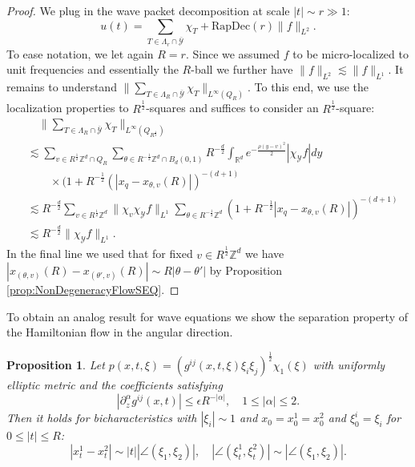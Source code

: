 \documentclass{amsart}
\newtheorem{proposition}[theorem]{Proposition}
\theoremstyle{definition}
\newcommand{\R}{\mathbb{R}}
\newcommand{\Z}{\mathbb{Z}}
\begin{document}
\begin{proof}
We plug in the wave packet decomposition at scale $|t| \sim r \gg 1$:
\begin{equation*}
u(t) = \sum_{T \in \Lambda_r \cap \overline{\mathcal{Y}}} \chi_T + \text{RapDec}(r) \| f \|_{L^2}.
\end{equation*}
To ease notation, we let again $R=r$. Since we assumed $f$ to be micro-localized to unit frequencies and essentially the $R$-ball we further have $\| f \|_{L^2} \lesssim \| f \|_{L^1}$. It remains to understand $\big\| \sum_{T \in \Lambda_R \cap \overline{\mathcal{Y}}} \chi_T \big\|_{L^\infty(Q_R)}$. To this end, we use the localization properties to $R^{\frac{1}{2}}$-squares and suffices to consider an $R^{\frac{1}{2}}$-square:
\begin{equation*}
\begin{split}
&\quad \big\| \sum_{T \in \Lambda_R \cap \overline{\mathcal{Y}}} \chi_T \big\|_{L^\infty(Q_{R^{\frac{1}{2}}})} \\
&\lesssim \sum_{v \in R^{\frac{1}{2}} \Z^d \cap Q_R} \sum_{\theta \in R^{-\frac{1}{2}} \Z^d \cap B_d(0,1)} R^{-\frac{d}{2}} \int_{\R^d} e^{- \frac{\rho (y-v)^2}{2}} |\chi_{\mathcal{Y}} f| dy \\
&\quad \quad \times (1+ R^{-\frac{1}{2}}(|x_q - x_{\theta,v}(R)|)^{-(d+1)} \\
&\lesssim R^{-\frac{d}{2}} \sum_{v \in R^{\frac{1}{2}} \Z^d} \| \chi_v \chi_{\mathcal{Y}} f \|_{L^1} \sum_{\theta \in R^{-\frac{1}{2}} \Z^d} (1 + R^{-\frac{1}{2}} |x_q - x_{\theta,v}(R)|)^{-(d+1)} \\
&\lesssim R^{-\frac{d}{2}} \| \chi_{\mathcal{Y}} f \|_{L^1}.
\end{split}
\end{equation*}
In the final line we used that for fixed $v \in R^{\frac{1}{2}} \Z^d$ we have $|x_{(\theta,v)}(R) - x_{(\theta',v)}(R)| \sim R|\theta - \theta'|$ by Proposition \ref{prop:NonDegeneracyFlowSEQ}.
\end{proof}
To obtain an analog result for wave equations we show the separation property of the Hamiltonian flow in the angular direction.
\begin{proposition}
\label{prop:NonDegeneracyFlowWave}
Let $p(x,t,\xi) = (g^{ij}(x,t,\xi) \xi_i \xi_j)^{\frac{1}{2}} \chi_1(\xi)$ with uniformly elliptic metric and the coefficients satisfying
\begin{equation*}
|\partial_z^{\alpha} g^{ij}(x,t)| \leq 
\epsilon R^{-|\alpha|}, \quad 1 \leq |\alpha| \leq 2.
\end{equation*}
Then it holds for bicharacteristics with $|\xi_i| \sim 1$ and $x_0 = x_0^1 = x_0^2$ and $\xi_0^i = \xi_i$ for $0 \leq |t| \leq R$:
\begin{equation*}
|x_t^1 - x_t^2| \sim |t| |\angle (\xi_1,\xi_2)|, \quad |\angle(\xi_t^1,\xi_t^2)| \sim |\angle(\xi_1,\xi_2)|.
\end{equation*} 
\end{proposition}
\end{document}
